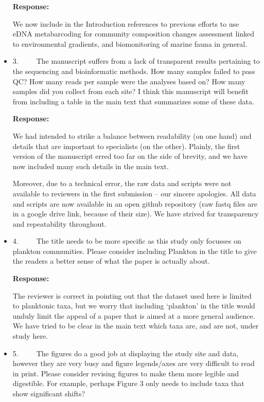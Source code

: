 \documentclass[11pt]{article}
\begin{document}
\begin{linenumbers}
\begin{itemize}
\textbf{Response:}

We now include in the Introduction references to previous efforts to use eDNA metabarcoding for community composition changes assessment linked to environmental gradients, and biomonitoring of marine fauna in general.

\item{3.      The manuscript suffers from a lack of transparent results pertaining to the sequencing and bioinformatic methods. How many samples failed to pass QC? How many reads per sample were the analyses based on? How many samples did you collect from each site? I think this manuscript will benefit from including a table in the main text that summarizes some of these data.}

\textbf{Response:}

We had intended to strike a balance between readability (on one hand) and details that are important to specialists (on the other). Plainly, the first version of the manuscript erred too far on the side of brevity, and we have now included many such details in the main text. 

Moreover, due to a technical error, the raw data and scripts were not available to reviewers in the first submission -- our sincere apologies. All data and scripts are now available in an open github repository (raw fastq files are in a google drive link, because of their size). We have strived for transparency and repeatability throughout.

\item{4.      The title needs to be more specific as this study only focusses on plankton communities. Please consider including Plankton in the title to give the readers a better sense of what the paper is actually about.}

\textbf{Response:}

The reviewer is correct in pointing out that the dataset used here is limited to  planktonic taxa, but we worry that including `plankton' in the title would unduly limit the appeal of a paper that is aimed at a more general audience. We have tried to be clear in the main text which taxa are, and are not, under study here.


\item{5.      The figures do a good job at displaying the study site and data, however they are very busy and figure legends/axes are very difficult to read in print. Please consider revising figures to make them more legible and digestible. For example, perhaps Figure 3 only needs to include taxa that show significant shifts? }


\end{itemize}
\end{linenumbers}
\end{document}
